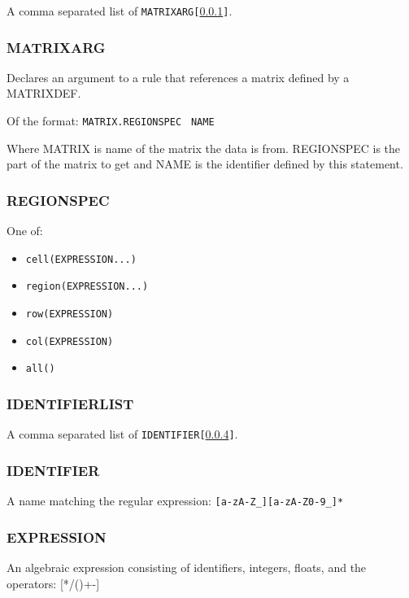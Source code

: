 \documentclass[11pt]{article}
\begin{document}
A comma separated list of {\tt MATRIXARG[\ref{MATRIXARG}]}.

\subsubsection{MATRIXARG}
\label{MATRIXARG}

Declares an argument to a rule that references a matrix defined by a MATRIXDEF.

Of the format: {\tt MATRIX.REGIONSPEC } {\tt NAME}

Where MATRIX is name of the matrix the data is from.  REGIONSPEC is the part
of the matrix to get and NAME is the identifier defined by this statement.

\subsubsection{REGIONSPEC}

One of:

\begin{itemize}
\item \tt cell(EXPRESSION...)
\item \tt region(EXPRESSION...)
\item \tt row(EXPRESSION)
\item \tt col(EXPRESSION)
\item \tt all()

\end{itemize}

\subsubsection{IDENTIFIERLIST}
\label{IDENTIFIERLIST}

A comma separated list of {\tt IDENTIFIER[\ref{IDENTIFIER}]}.

\subsubsection{IDENTIFIER}
\label{IDENTIFIER}

A name matching the regular expression: {\tt [a-zA-Z\_][a-zA-Z0-9\_]*}

\subsubsection{EXPRESSION}
\label{EXPRESSION}

An algebraic expression consisting of identifiers, integers, floats, and the operators: [*/()+-]
\end{document}
